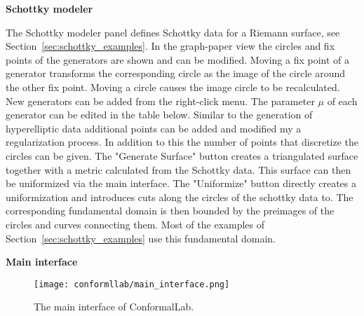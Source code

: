 \documentclass[Thesis.tex]{subfiles}
\begin{document}
\newpage

{\bf Schottky modeler}

The Schottky modeler panel defines Schottky data for a Riemann surface, see
Section~\ref{sec:schottky_examples}. In the graph-paper view the circles and
fix points of the generators are shown and can be modified. Moving a fix point
of a generator transforms the corresponding circle as the image of the
circle around the other fix point. Moving a circle causes the image circle to be recalculated. 
New generators can be added from the right-click menu. The parameter $\mu$ of
each generator can be edited in the table below.
Similar to the generation of hyperelliptic data additional points can be added and modified my
a regularization process. In addition to this the number of points that discretize the
circles can be given.
The "Generate Surface" button creates a triangulated surface together with
a metric calculated from the Schottky data. This surface can then be uniformized
via the main interface. The "Uniformize" button directly creates a uniformization and 
introduces cuts along the circles of the schottky data to. The corresponding fundamental
domain is then bounded by the preimages of the circles and curves connecting them.
Most of the examples of Section~\ref{sec:schottky_examples} use this fundamental domain.

{\bf Main interface}

\begin{wrapfigure}{r}{0pt}
\centering
\texttt{[image: conformllab/main\_interface.png]}
\caption{The main interface of {\sc ConformalLab}.}
\label{fig:conformal_main}
\end{wrapfigure}



\subfilebibliography
\end{document}
